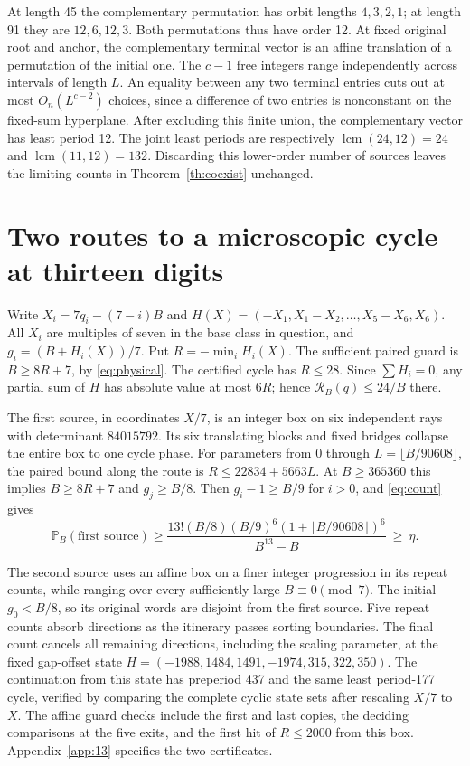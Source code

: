 \documentclass[11pt,reqno]{amsart}
\theoremstyle{remark}
\newcommand{\PP}{\mathbb P}
\newcommand{\lcm}{\operatorname{lcm}}
\begin{document}
At length 45 the complementary permutation has orbit lengths
\(4,3,2,1\); at length 91 they are \(12,6,12,3\).
Both permutations thus have order 12. At fixed original root
and anchor, the complementary terminal vector is an affine
translation of a permutation of the initial one. The \(c-1\)
free integers range independently across intervals of length \(L\).
An equality between any two terminal entries cuts out at most
\(O_n(L^{c-2})\) choices, since a difference of two entries
is nonconstant on the fixed-sum hyperplane. After excluding this
finite union, the complementary vector has least period 12.
The joint least periods are respectively
\(\lcm(24,12)=24\) and \(\lcm(11,12)=132\).
Discarding this lower-order number of sources leaves the limiting
counts in Theorem~\ref{th:coexist} unchanged.

\section{Two routes to a microscopic cycle at thirteen digits}\label{sec:13}

Write \(X_i=7q_i-(7-i)B\) and
\(H(X)=(-X_1,X_1-X_2,\ldots,X_5-X_6,X_6)\).
All \(X_i\) are multiples of seven in the base class in question,
and \(g_i=(B+H_i(X))/7\). Put \(R=-\min_iH_i(X)\).
The sufficient paired guard is \(B\ge8R+7\), by
\eqref{eq:physical}. The certified cycle has \(R\le28\).
Since \(\sum H_i=0\), any partial sum of \(H\) has absolute
value at most \(6R\); hence \(\mathcal R_B(q)\le24/B\) there.

The first source, in coordinates \(X/7\), is an integer box
on six independent rays with determinant \(84015792\).
Its six translating blocks and fixed bridges collapse the entire
box to one cycle phase. For parameters from 0 through
\(L=\lfloor B/90608\rfloor\), the paired bound along the route is
\(R\le22834+5663L\). At \(B\ge365360\)
this implies \(B\ge8R+7\) and \(g_j\ge B/8\).
Then \(g_i-1\ge B/9\) for \(i>0\), and
\eqref{eq:count} gives
\[
 \PP_B(\text{first source})\ge
 \frac{13!(B/8)(B/9)^6(1+\lfloor B/90608\rfloor)^6}{B^{13}-B}
 \ \ge\ \eta.
\]

The second source uses an affine box on a finer integer progression
in its repeat counts, while ranging over every sufficiently large
\(B\equiv0\pmod7\). The initial \(g_0<B/8\), so its original
words are disjoint from the first source. Five repeat counts absorb
directions as the itinerary passes sorting boundaries. The final
count cancels all remaining directions, including the scaling
parameter, at the fixed gap-offset state
\(H=(-1988,1484,1491,-1974,315,322,350)\).
The continuation from this state has preperiod 437 and the
same least period-177 cycle, verified by comparing the complete
cyclic state sets after rescaling \(X/7\) to \(X\).
The affine guard checks include the first and last copies,
the deciding comparisons at the five exits, and the first hit of
\(R\le2000\) from this box. Appendix~\ref{app:13} specifies the
two certificates.
\end{document}

